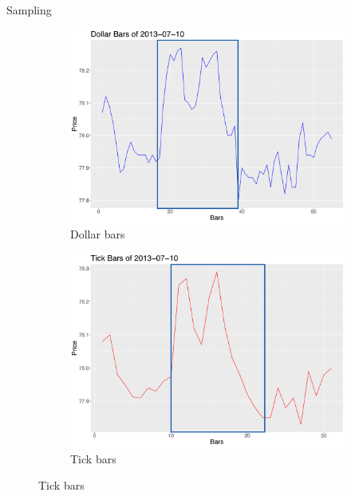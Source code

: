 \documentclass[usenames,dvipsnames]{beamer} %
\begin{document}
\begin{frame}{Sampling}
\begin{figure}[htbp]
	\begin{subfigure}{.5\textwidth}
		\centering
		\includegraphics[scale=.15]{img/dollarZoomBis}
		\caption{Dollar bars}
	\end{subfigure}%
	\begin{subfigure}{.5\textwidth}
		\centering
		\includegraphics[scale=.15]{img/tickZoomBis}
		\caption{Tick bars}
	\end{subfigure}%
	
\end{figure}
\end{frame}
\end{document}
